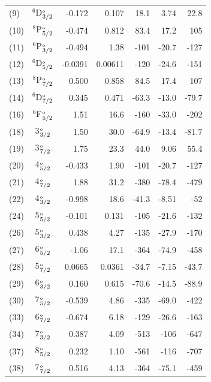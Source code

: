\documentclass[10pt,a4paper, twoside, openright]{report}
\begin{document}
{\begin{longtable}{l@{\hspace{0.01cm}}c@{\hspace{0.5cm}}r@{\hspace{0.5cm}}r@{\hspace{0.5cm}}r@{\hspace{0.5cm}}r@{\hspace{0.5cm}}r}
(9)  & $^6$D$_{3/2}^{\rm_o}$     & -0.172 & 0.107 & 18.1 & 3.74 & 22.8  \\ 
(10) & $^8$P$_{5/2}^{\rm_o}$     & -0.474 &  0.812 & 83.4 & 17.2 & 105 \\ 
(11) &  $^6$P$_{3/2}^{\rm_o}$     & -0.494 & 1.38 & -101 & -20.7 & -127 \\ 
(12) &  $^6$D$_{5/2}^{\rm_o}$     & -0.0391 & 0.00611 & -120 & -24.6 & -151 \\ 
(13)  & $^8$P$_{7/2}^{\rm_o}$     & 0.500 & 0.858 & 84.5 & 17.4 & 107 \\ 
(14)  & $^6$D$_{7/2}^{\rm_o}$     & 0.345 & 0.471 & -63.3 & -13.0 & -79.7 \\ 
(16) & $^6$F$_{5/2}^{\rm_o}$     & 1.51 & 16.6 & -160 & -33.0 & -202 \\
(18)  & 3$_{3/2}^{\rm_o}$  & 1.50 & 30.0 & -64.9 & -13.4 & -81.7 \\
(19) & 3$_{7/2}^{\rm_o}$   & 1.75 & 23.3 & 44.0 & 9.06& 55.4 \\
(20) & 4$_{5/2}^{\rm_o}$   &  -0.433 & 1.90 & -101 & -20.7 & -127  \\
(21) & 4$_{7/2}^{\rm_o}$   &  1.88 & 31.2 & -380 & -78.4 & -479 \\
(22) & 4$_{3/2}^{\rm_o}$  &   -0.998 & 18.6 & -41.3 & -8.51& -52 \\
(24) & 5$_{5/2}^{\rm_o}$  &   -0.101 & 0.131 & -105 & -21.6 & -132 \\
(26) & 5$_{3/2}^{\rm_o}$   &   0.438 & 4.27 & -135 & -27.9 & -170 \\
(27) & 6$_{5/2}^{\rm_o}$  &   -1.06 & 17.1 & -364 & -74.9 & -458 \\
(28) & 5$_{7/2}^{\rm_o}$  &  0.0665 & 0.0361 & -34.7 & -7.15 & -43.7 \\
(29) & 6$_{3/2}^{\rm_o}$    &  0.160 & 0.615 & -70.6 & -14.5 & -88.9 \\
(30) & 7$_{5/2}^{\rm_o}$    &  -0.539 & 4.86 & -335 & -69.0 & -422\\
(33) & 6$_{7/2}^{\rm_o}$   &   -0.674 & 6.18 & -129 & -26.6 & -163 \\
(34) & 7$_{3/2}^{\rm_o}$   &  0.387 & 4.09 & -513 & -106 & -647 \\
(37) & 8$_{5/2}^{\rm_o}$   &  0.232 & 1.10 & -561 & -116 & -707\\
(38) & 7$_{7/2}^{\rm_o}$  &  0.516 & 4.13 & -364 & -75.1 & -459 \\
\bottomrule
\bottomrule
\end{longtable}
}
\end{document}

